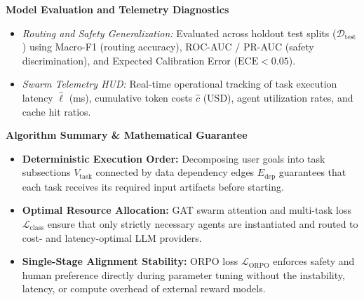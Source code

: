 \documentclass[11pt,a4paper]{article}
\begin{document}
\vspace{0.12em}
\textbf{Model Evaluation and Telemetry Diagnostics}
\begin{itemize}[leftmargin=1.5em, itemsep=0.06em, topsep=0.02em]
    \item \textit{Routing and Safety Generalization:} Evaluated across holdout test splits ($\mathcal{D}_{\text{test}}$) using Macro-F1 (routing accuracy), ROC-AUC / PR-AUC (safety discrimination), and Expected Calibration Error ($\mathrm{ECE} < 0.05$).
    \item \textit{Swarm Telemetry HUD:} Real-time operational tracking of task execution latency $\hat{\ell}$ (ms), cumulative token costs $\hat{c}$ (USD), agent utilization rates, and cache hit ratios.
\end{itemize}

\vspace{0.14em}
\textbf{Algorithm Summary \& Mathematical Guarantee}
\begin{itemize}[leftmargin=1.5em, itemsep=0.06em, topsep=0.02em]
    \item \textbf{Deterministic Execution Order:} Decomposing user goals into task subsections $V_{\text{task}}$ connected by data dependency edges $E_{\text{dep}}$ guarantees that each task receives its required input artifacts before starting.
    \item \textbf{Optimal Resource Allocation:} GAT swarm attention and multi-task loss $\mathcal{L}_{\text{class}}$ ensure that only strictly necessary agents are instantiated and routed to cost- and latency-optimal LLM providers.
    \item \textbf{Single-Stage Alignment Stability:} ORPO loss $\mathcal{L}_{\mathrm{ORPO}}$ enforces safety and human preference directly during parameter tuning without the instability, latency, or compute overhead of external reward models.
\end{itemize}
\end{document}
